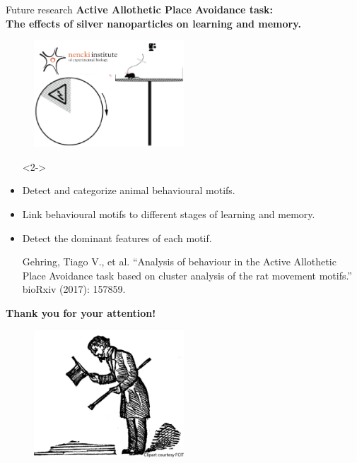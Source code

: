 \documentclass{beamer}
\newlength{\tmpShadow}
\newcommand{\MyShadow}[2]{%
	\settowidth{\tmpShadow}{#1}
	\addtolength{\tmpShadow}{.1em}
	\raisebox{-0.25ex}{\textcolor{gray!70}{#1}}%
	\kern-\tmpShadow%
	\textcolor{#2}{#1}%
}
\begin{document}
{\begin{frame}{Future research}
\textbf{Active Allothetic Place Avoidance task: \\The effects of silver nanoparticles on learning and memory. }
\begin{multicols}{2}
	\begin{figure}[H]
		\centering
		\includegraphics[width=0.5\textwidth]{figures/placeavoid2}
	\end{figure}
\begin{itemize}[label={\MyShadow{$\bullet$}{blue!80}}, leftmargin=*]
	\item[]<2-> 
	\item<2-> Detect and categorize animal behavioural motifs.
	\item<2-> Link behavioural motifs to different stages of learning and memory.
	\item<2-> Detect the dominant features of each motif.
\end{itemize}
\end{multicols}
\vspace{1.0cm}
\begin{tiny}
\begin{itemize}[leftmargin=*]
	\item[] Gehring, Tiago V., et al. ``Analysis of behaviour in the Active Allothetic Place Avoidance task based on cluster analysis of the rat movement motifs.'' bioRxiv (2017): 157859.	
\end{itemize}
\end{tiny}	
\end{frame}


\begin{frame}[plain,c]
\begin{Large}
	\begin{center}
		\textbf{Thank you for your attention!}
	\end{center}
\end{Large}	
\begin{figure}[H]
	\centering
	\includegraphics[width=0.5\textwidth]{figures/final}
\end{figure}
\end{frame}


}
\end{document}
